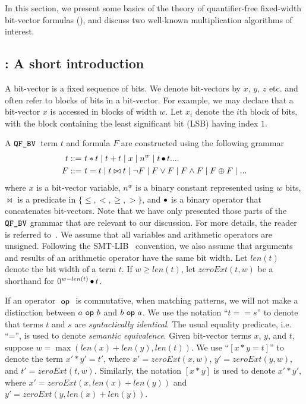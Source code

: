 In this section, we present some basics of the theory of
quantifier-free fixed-width bit-vector formulas (\qfbv), and discuss
two well-known multiplication algorithms of interest.

%

\subsection{\qfbv: A short introduction}

A bit-vector is a fixed sequence of bits.
%
We denote bit-vectors by $x$, $y$, $z$ etc. and often
%
refer to blocks of bits in a bit-vector.
%
For example, we may declare that a bit-vector $x$ is accessed in
blocks of width $w$.
%
Let $x_i$ denote the $i$th block of bits, with the block containing
the least significant bit (LSB) having index $1$.
%

A $\texttt{QF\_BV}$~term $t$ and formula $F$ are constructed using
the following grammar
\begin{align*}
t ::= &~ t * t \mid t + t \mid x \mid n^w \mid t \mathop{\bullet} t  ....\\
F ::= &~ t = t \mid t \bowtie t \mid \lnot F \mid F \lor F \mid F \land F \mid F \oplus F \mid ... 
\end{align*}
where $x$ is a bit-vector variable, $n^w$ is a binary constant
represented using $w$ bits, $\bowtie$ is a predicate in $\{\leq , <,
\geq, > \}$, and $\mathop{\bullet}$ is a binary operator that concatenates
bit-vectors.
%
Note that we have only presented those parts of the $\texttt{QF\_BV}$ grammar
that are relevant to our discussion.  For more details,
the reader is referred to~\cite{Kroeningbook,barrett}.
%
We assume that all variables and arithmetic operators are unsigned.
Following the SMT-LIB~\cite{SMTLIB} convention, we also assume that
arguments and results of an arithmetic operator have the same bit width.
%
Let $len(t)$ denote the bit width of a term $t$.
%
If $w \geq len(t)$,
let $zeroExt(t,w)$ be a shorthand for  $0^{w-len(t)}\mathop{\bullet} t$.

If an operator $~\mathsf{op}~$ is commutative, when matching patterns, we will
not make a distinction between $a ~\mathsf{op}~ b$ and $b ~\mathsf{op}~ a$.
%
We use the notation ``$t == s$'' to denote that terms $t$ and $s$ are
\emph{syntactically identical}. The usual equality predicate, i.e. ``='',
is used to denote \emph{semantic equivalence}.
%
Given bit-vector terms $x$, $y$, and $t$, suppose $w = \max(len(x) + len(y),
len(t))$.
%
We use ``$[x*y = t]$'' to denote the term $x'*y'= t'$, where $x' =
zeroExt(x, w)$, $y' = zeroExt(y, w)$, and $t' = zeroExt(t, w)$.
%
Similarly, the notation $[x*y]$ is used to denote $x' * y'$, where $x'
= zeroExt(x, len(x)+len(y))$ and $y' = zeroExt(y, len(x) + len(y))$.

